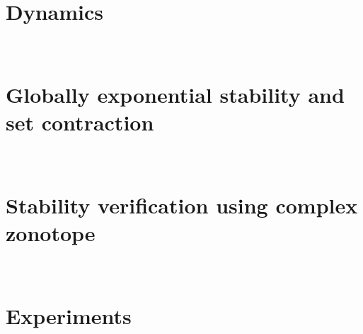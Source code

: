 \section{Dynamics}~\label{sec:dynamics}


\section{Globally exponential stability and set contraction}~\label{sec:ges}


\section{Stability verification using complex zonotope}~\label{sec:alg}


\section{Experiments}~\label{sec:experiments}

